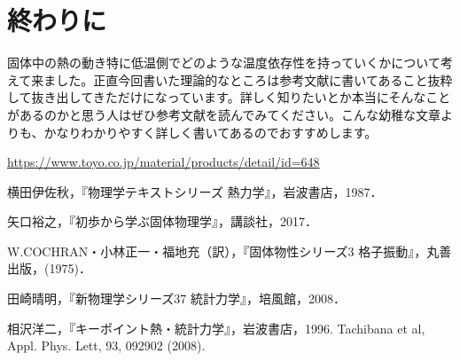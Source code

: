 \documentclass[10pt,b5paper,papersize,dvipdfmx]{jsbook}
\begin{document}
\section{終わりに}
固体中の熱の動き特に低温側でどのような温度依存性を持っていくかについて考えて来ました。正直今回書いた理論的なところは参考文献に書いてあること抜粋して抜き出してきただけになっています。詳しく知りたいとか本当にそんなことがあるのかと思う人はぜひ参考文献を読んでみてください。こんな幼稚な文章よりも、かなりわかりやすく詳しく書いてあるのでおすすめします。
\begin{thebibliography}{99}
   \url{https://www.toyo.co.jp/material/products/detail/id=648}
  \item 横田伊佐秋，『物理学テキストシリーズ 熱力学』，岩波書店，1987．
  \item 矢口裕之，『初歩から学ぶ固体物理学』，講談社，2017．
  \item W.COCHRAN・小林正一・福地充（訳），『固体物性シリーズ3 格子振動』，丸善出版，(1975)．
  \item 田崎晴明，『新物理学シリーズ37 統計力学』，培風館，2008．
  \item 相沢洋二，『キーポイント熱・統計力学』，岩波書店，1996.
  Tachibana et al, Appl. Phys. Lett, 93, 092902 (2008).
\end{thebibliography}
\end{document}
